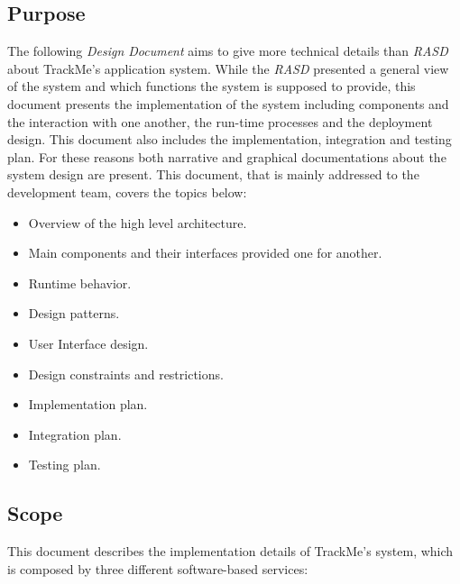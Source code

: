 \subsection{Purpose}
The following \textit{Design Document} aims to give more technical details than \textit{RASD} about TrackMe's application system. While the \textit{RASD} presented a general view of the system and which functions the system is supposed to provide, this document presents the implementation of the system including components and the interaction with one another, the run-time processes and the deployment design. This document also includes the implementation, integration and testing plan. For these reasons both narrative and graphical documentations about the system design are present.
\bigbreak
\noindent
This document, that is mainly addressed to the development team, covers the topics below:
\begin{itemize}[noitemsep]
\item Overview of the high level architecture.
\item Main components and their interfaces provided one for another.
\item Runtime behavior.
\item Design patterns.
\item User Interface design.
\item Design constraints and restrictions.
\item Implementation plan.
\item Integration plan.
\item Testing plan.
\end{itemize}

\subsection{Scope} 
This document describes the implementation details of TrackMe's system, which is composed by three different software-based services:

